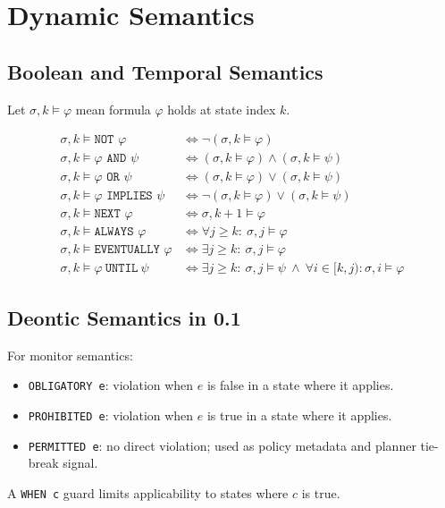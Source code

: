 \documentclass[11pt,a4paper]{article}
\begin{document}
\section{Dynamic Semantics}
\subsection{Boolean and Temporal Semantics}
Let $\sigma,k \models \varphi$ mean formula $\varphi$ holds at state index $k$.

\begin{align*}
\sigma,k \models \texttt{NOT }\varphi &\iff \neg(\sigma,k \models \varphi) \\
\sigma,k \models \varphi \texttt{ AND }\psi &\iff (\sigma,k \models \varphi) \land (\sigma,k \models \psi) \\
\sigma,k \models \varphi \texttt{ OR }\psi &\iff (\sigma,k \models \varphi) \lor (\sigma,k \models \psi) \\
\sigma,k \models \varphi \texttt{ IMPLIES }\psi &\iff \neg(\sigma,k \models \varphi) \lor (\sigma,k \models \psi) \\
\sigma,k \models \texttt{NEXT }\varphi &\iff \sigma,k+1 \models \varphi \\
\sigma,k \models \texttt{ALWAYS }\varphi &\iff \forall j\geq k:\ \sigma,j \models \varphi \\
\sigma,k \models \texttt{EVENTUALLY }\varphi &\iff \exists j\geq k:\ \sigma,j \models \varphi \\
\sigma,k \models \varphi\ \texttt{UNTIL}\ \psi &\iff \exists j\geq k:\ \sigma,j \models \psi\ \land\ \forall i\in[k,j):\sigma,i\models\varphi
\end{align*}

\subsection{Deontic Semantics in 0.1}
For monitor semantics:
\begin{itemize}[leftmargin=*]
  \item \texttt{OBLIGATORY e}: violation when $e$ is false in a state where it applies.
  \item \texttt{PROHIBITED e}: violation when $e$ is true in a state where it applies.
  \item \texttt{PERMITTED e}: no direct violation; used as policy metadata and planner tie-break signal.
\end{itemize}
A \texttt{WHEN c} guard limits applicability to states where $c$ is true.
\end{document}

